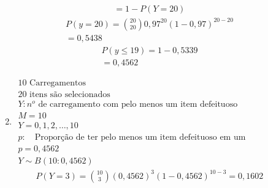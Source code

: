 \begin{description}
\begin{enumerate}[label=(\alph*)]
\begin{align*}
            =1-P(Y=20)
          \end{align*}
          \begin{align*}
            P(y=20)=\binom{20}{20}0,97^{20}(1-0,97)^{20-20}\\
            =0,5438
          \end{align*}
          \begin{align*}
            P(y\le 19)=1-0,5339\\
            =0,4562
          \end{align*}
        \item
          \begin{align*}
            10\text{ Carregamentos}\\
           20  \text{ itens são selecionados} \\
           Y: \text{$n^o$ de carregamento com pelo menos um item defeituoso} \\
          M=10\\
          Y=0,1,2,\ldots,10\\
          p:\quad \text{Proporção de ter pelo menos um item defeituoso em um carregamento}\\
          p=0,4562\\
          Y \sim B(10:0,4562)
        \end{align*}
        \begin{align*}
            P(Y=3)=\binom{10}{3}(0,4562)^3 (1-0,4562)^{10-3}  =0,1602
          \end{align*}
      \end{enumerate}
    \end{description}

